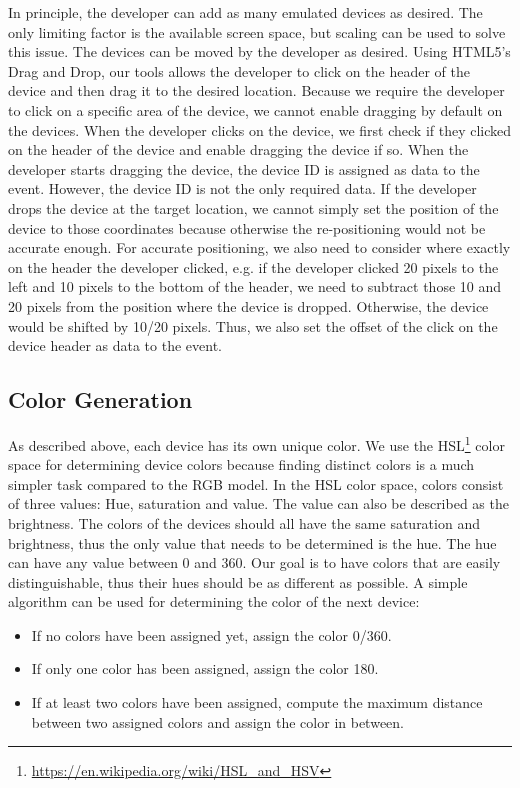In principle, the developer can add as many emulated devices as desired. The only limiting factor is the available screen space, but scaling can be used to solve this issue. The devices can be moved by the developer as desired. Using HTML5's Drag and Drop, our tools allows the developer to click on the header of the device and then drag it to the desired location. Because we require the developer to click on a specific area of the device, we cannot enable dragging by default on the devices. When the developer clicks on the device, we first check if they clicked on the header of the device and enable dragging the device if so. When the developer starts dragging the device, the device ID is assigned as data to the event. However, the device ID is not the only required data. If the developer drops the device at the target location, we cannot simply set the position of the device to those coordinates because otherwise the re-positioning would not be accurate enough. For accurate positioning, we also need to consider where exactly on the header the developer clicked, e.g. if the developer clicked 20 pixels to the left and 10 pixels to the bottom of the header, we need to subtract those 10 and 20 pixels from the position where the device is dropped. Otherwise, the device would be shifted by 10/20 pixels. Thus, we also set the offset of the click on the device header as data to the event.

\subsection{Color Generation}
As described above, each device has its own unique color. We use the HSL\footnote{\url{https://en.wikipedia.org/wiki/HSL_and_HSV}} color space for determining device colors because finding distinct colors is a much simpler task compared to the RGB model. In the HSL color space, colors consist of three values: Hue, saturation and value. The value can also be described as the brightness. The colors of the devices should all have the same saturation and brightness, thus the only value that needs to be determined is the hue. The hue can have any value between 0 and 360. Our goal is to have colors that are easily distinguishable, thus their hues should be as different as possible. A simple algorithm can be used for determining the color of the next device:
\begin{itemize}
	\item If no colors have been assigned yet, assign the color 0/360.
	\item If only one color has been assigned, assign the color 180.
	\item If at least two colors have been assigned, compute the maximum distance between two assigned colors and assign the color in between.
\end{itemize}

